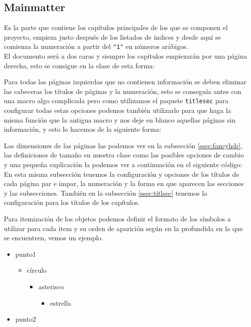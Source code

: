        \subsection{Mainmatter}
Es la parte que contiene los capítulos principales de los que se componen el proyecto, empieza justo después de los listados de índices y desde aquí se comienza la numeración a partir del \verb|"1"| en números arábigos.\\
El documento será  a dos caras y siempre los capítulos empiezarán por una página derecha, esto se consigue en la clase de esta forma:\\

Para todas las páginas izquierdas que no contienen información se deben eliminar las cabeceras los títulos de páginas y la numeración, esto se conseguía antes con una macro algo complicada pero como utilizamos el paquete \verb|titlesec| para configurar todas estas opciones podemos también utilizarlo para que haga la misma función que la antigua macro y nos deje en blanco aquellas páginas sin información, y esto lo hacemos de la siguiente forma:\\

Las dimensiones de las páginas las podemos ver en la subsección \ref{ssec:fancyhdr}, las definiciones de tamaño en nuestra clase como las posibles opciones de cambio y una pequeña explicación la  podemos ver a continuación en el siguiente código:\\
En esta misma subsección tenemos la configuración y opciones de los títulos de cada página par e impar, la numeración y la forma en que aparecen las secciones y las subsecciones.
También en la subsección \ref{ssec:titlsec} tenemos la configuración para los títulos de los capítulos.

Para itemización de los objetos podemos definir el formato de los símbolos a utilizar para cada item y su orden de aparición según en la profundida en la 	que se encuentren, vemos un ejemplo.
\begin{itemize}
 \item punto1
	\begin{itemize}
	\item círculo
		\begin{itemize}
			\item asterisco
				\begin{itemize}
					\item estrella
				\end{itemize}
		\end{itemize}
	\end{itemize}
 \item punto2
\end{itemize}

